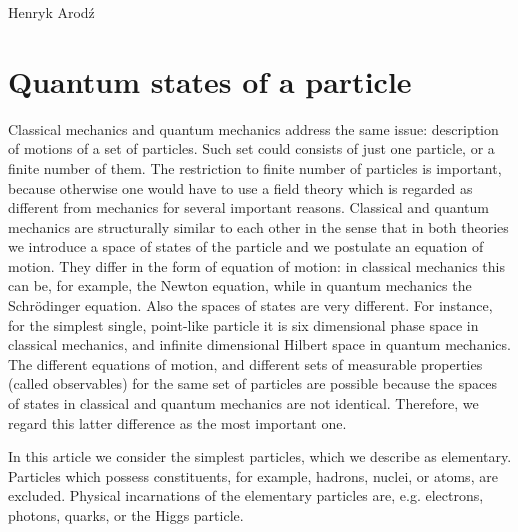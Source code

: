 \begin{artengenv}{Henryk Arod\'z}
\section{Quantum states of a particle }



Classical mechanics and quantum mechanics address the same issue: description of motions of a set of particles. Such set could consists of just one particle, or a finite number of them. The restriction to finite number of particles is important, because otherwise one would have to use a field theory which is regarded as different from mechanics for several important reasons. Classical and quantum mechanics are structurally similar to each other in the sense that in both theories we introduce a space of states of the particle and we postulate an equation of motion. They differ in the form of equation of motion: in classical mechanics this can be, for example, the Newton equation, while in quantum mechanics the Schr\"odinger equation. Also
 the spaces of states are very different. For instance, for the simplest single, point-like particle it is six dimensional phase space in classical mechanics, and infinite dimensional Hilbert space in quantum mechanics. The different equations of motion, and different sets of measurable properties (called observables) for the same set of particles are possible because the spaces of states in classical and quantum mechanics are not identical. Therefore, we regard this latter difference as the most important one. 

In this article we consider the simplest particles, which we describe as elementary. Particles which possess constituents, for example, hadrons, nuclei, or atoms, are excluded. Physical incarnations of the elementary particles are, e.g. electrons, photons, quarks, or the Higgs particle. 


\end{artengenv}
